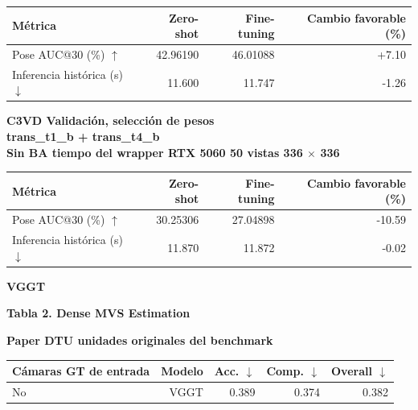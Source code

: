 \documentclass[10pt,a4paper]{article}
\begin{document}
\vspace{2mm}
\begingroup\small
\begin{tabularx}{\textwidth}{@{}LRRR@{}}
\toprule
\textbf{Métrica} & \textbf{Zero-shot} & \textbf{Fine-tuning} & \textbf{Cambio favorable (\%)} \\
\midrule
Pose AUC@30 (\%) \(\uparrow\) & 42.96190 & 46.01088 & +7.10 \\
Inferencia histórica (s) \(\downarrow\) & 11.600 & 11.747 & -1.26 \\
\bottomrule
\end{tabularx}
\endgroup
\vspace{6mm}
{\small\bfseries C3VD \textperiodcentered{} Validación, selección de pesos\\trans\_t1\_b + trans\_t4\_b\\Sin BA \textperiodcentered{} tiempo del wrapper \textperiodcentered{} RTX 5060 \textperiodcentered{} 50 vistas \textperiodcentered{} 336 \(\times\) 336}\par
\vspace{2mm}
\begingroup\small
\begin{tabularx}{\textwidth}{@{}LRRR@{}}
\toprule
\textbf{Métrica} & \textbf{Zero-shot} & \textbf{Fine-tuning} & \textbf{Cambio favorable (\%)} \\
\midrule
Pose AUC@30 (\%) \(\uparrow\) & 30.25306 & 27.04898 & -10.59 \\
Inferencia histórica (s) \(\downarrow\) & 11.870 & 11.872 & -0.02 \\
\bottomrule
\end{tabularx}
\endgroup
\vspace{6mm}
\clearpage
{\Large\bfseries\color{header} VGGT}\par
\vspace{5mm}
{\large\bfseries Tabla 2. Dense MVS Estimation}\par
\vspace{4mm}
{\small\bfseries Paper \textperiodcentered{} DTU \textperiodcentered{} unidades originales del benchmark}\par
\vspace{2mm}
\begingroup\small
\begin{tabularx}{\textwidth}{@{}LRRRR@{}}
\toprule
\textbf{Cámaras GT de entrada} & \textbf{Modelo} & \textbf{Acc. \(\downarrow\)} & \textbf{Comp. \(\downarrow\)} & \textbf{Overall \(\downarrow\)} \\
\midrule
No & VGGT & 0.389 & 0.374 & 0.382 \\
\bottomrule
\end{tabularx}
\end{document}
